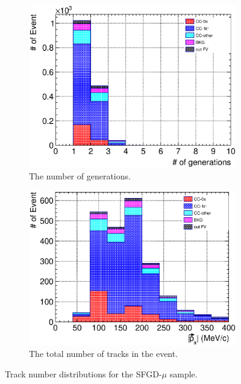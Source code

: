 \begin{figure}
  \\
  \begin{subfigure}{\dbfigwid\textwidth}
       \includegraphics[width=\textwidth]{figures/sel/SFGmu_ngen_stack_al8.eps}
        \caption{The number of generations.}
        \label{subfig:tlpi-trknum-gen-sfgmu}
  \end{subfigure}
  \begin{subfigure}{\dbfigwid\textwidth}
       \includegraphics[width=\textwidth]{figures/sel/SFGmu_p_pi_stack_al8.eps}
       \caption{The total number of tracks in the event.}
       \label{subfig:tlpi-trknum-ppi-sfgmu}
  \end{subfigure}
  \caption{Track number distributions for the SFGD-$\mu$ sample.}
  \label{fig:tlpi-trknum-sfgmu}
\end{figure}

